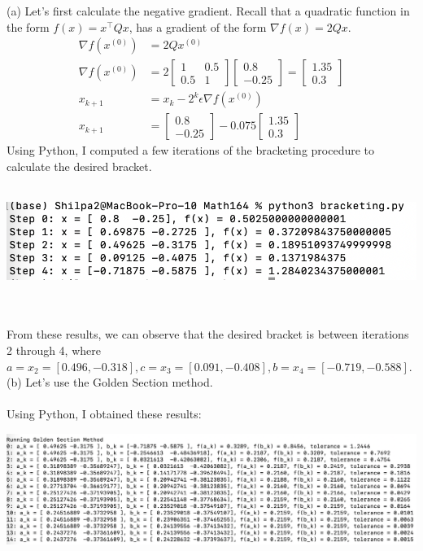\documentclass[12pt]{article}
\begin{document}
(a) Let's first calculate the negative gradient. Recall that a quadratic function in the form $f(x)=x^{\top}Qx$, has a gradient of the form $\nabla f(x) = 2Qx$.
\begin{align}
    \nabla f(x^{(0)}) &= 2Qx^{(0)}  \\
    \nabla f(x^{(0)}) &= 2 \begin{bmatrix} 1 & 0.5 \\ 0.5 & 1 \end{bmatrix} \begin{bmatrix} 0.8 \\ -0.25 \end{bmatrix} = \begin{bmatrix} 1.35 \\ 0.3 \end{bmatrix} \\
    x_{k+1} &= x_k - 2^k\epsilon  \nabla f(x^{(0)}) \\
    x_{k+1} &= \begin{bmatrix} 0.8 \\ -0.25 \end{bmatrix} - 0.075 \begin{bmatrix} 1.35 \\ 0.3 \end{bmatrix}
\end{align}
Using Python, I computed a few iterations of the bracketing procedure to calculate the desired bracket.\\ 
\\
\begin{minipage}{1.2\textwidth}
\end{minipage}
\begin{minipage}{0.8\textwidth}
    \centering
    \includegraphics[width=\textwidth]{bracketing.png} 
\end{minipage} 
\\ \\ From these results, we can observe that the desired bracket is between iterations 2 through 4, where
$ a = x_2 = [0.496, -0.318], c  = x_3 = [0.091, -0.408], b = x_4 = [-0.719, -0.588]$.
\\
(b) Let's use the Golden Section method. \\ \\
Using Python, I obtained these results:
\\
\noindent
\hspace*{-2.4cm}
\begin{minipage}{1.3\textwidth}
    \includegraphics[width=\textwidth]{golden_section.png} 
\end{minipage}
\\
\end{document}
